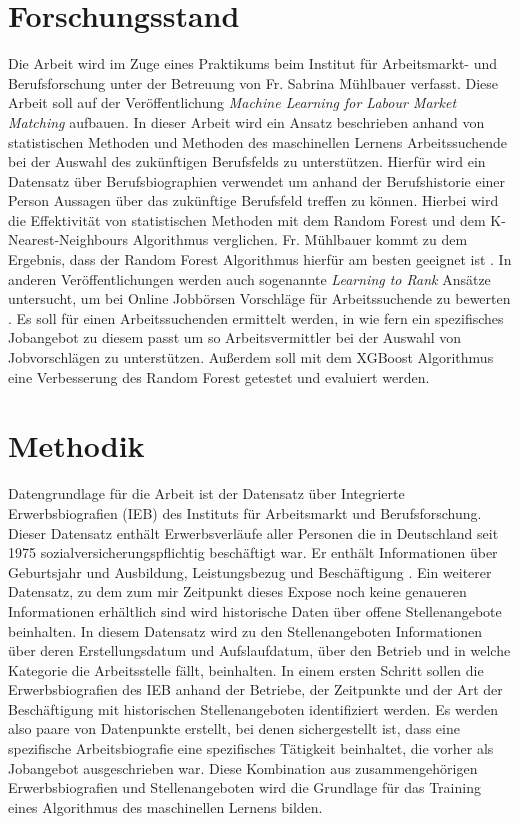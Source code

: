 \documentclass[
    11pt,
    a4paper,
    egregdoesnotlikesansseriftitles,
    toc=chapterentrywithdots,
    oneside,openright,
    titlepage,
    parskip=half,
    headings=normal,  %
    listof=totoc,
    bibliography=totoc,
    index=totoc,
    captions=tableheading,  %
    chapterprefix,
    listof=flat,
    final
]{scrbook}
\begin{document}
{\let\clearpage\relax \chapter{Forschungsstand}}
Die Arbeit wird im Zuge eines Praktikums beim Institut für Arbeitsmarkt- und Berufsforschung unter der Betreuung von Fr. Sabrina Mühlbauer verfasst. Diese Arbeit soll auf der Veröffentlichung \textit{Machine Learning for Labour Market Matching} aufbauen\cite{mül}. In dieser Arbeit wird ein Ansatz beschrieben anhand von statistischen Methoden und Methoden des maschinellen Lernens Arbeitssuchende bei der Auswahl des zukünftigen Berufsfelds zu unterstützen. Hierfür wird ein Datensatz über Berufsbiographien verwendet um anhand der Berufshistorie einer Person Aussagen über das zukünftige Berufsfeld treffen zu können. Hierbei wird die Effektivität von statistischen Methoden mit dem Random Forest und dem K-Nearest-Neighbours Algorithmus verglichen. Fr. Mühlbauer kommt zu dem Ergebnis, dass der Random Forest Algorithmus hierfür am besten geeignet ist \cite{mül}. In anderen Veröffentlichungen werden auch sogenannte \textit{Learning to Rank} Ansätze untersucht, um bei Online Jobbörsen Vorschläge für Arbeitssuchende zu bewerten \cite{hiri}.
Es soll für einen Arbeitssuchenden ermittelt werden, in wie fern ein spezifisches Jobangebot zu diesem passt um so Arbeitsvermittler bei der Auswahl von Jobvorschlägen zu unterstützen. Außerdem soll mit dem XGBoost Algorithmus eine Verbesserung des Random Forest getestet und evaluiert werden.
\newline










{\let\clearpage\relax \chapter{Methodik}\label{Methodik}}
Datengrundlage für die Arbeit ist der Datensatz über Integrierte Erwerbsbiografien (IEB) des Instituts für Arbeitsmarkt und Berufsforschung. Dieser Datensatz enthält Erwerbsverläufe aller Personen die in Deutschland seit 1975 sozialversicherungspflichtig beschäftigt war. Er enthält Informationen über Geburtsjahr und Ausbildung, Leistungsbezug und Beschäftigung \cite{ieb}.
Ein weiterer Datensatz, zu dem zum mir Zeitpunkt dieses Expose noch keine genaueren Informationen erhältlich sind wird historische Daten über offene Stellenangebote beinhalten. In diesem Datensatz wird zu den Stellenangeboten Informationen über deren Erstellungsdatum und Aufslaufdatum, über den Betrieb und in welche Kategorie die Arbeitsstelle fällt, beinhalten. In einem ersten Schritt sollen die Erwerbsbiografien des IEB anhand der Betriebe, der Zeitpunkte und der Art der Beschäftigung mit historischen Stellenangeboten identifiziert werden. Es werden also paare von Datenpunkte erstellt, bei denen sichergestellt ist, dass eine spezifische Arbeitsbiografie eine spezifisches Tätigkeit beinhaltet, die vorher als Jobangebot ausgeschrieben war. Diese Kombination aus zusammengehörigen Erwerbsbiografien und Stellenangeboten wird die Grundlage für das Training eines Algorithmus des maschinellen Lernens bilden.
\end{document}
